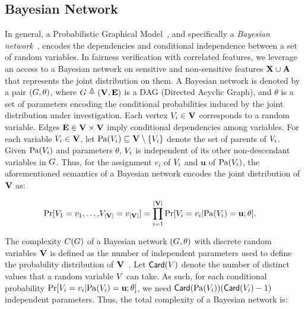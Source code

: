 \subsection{Bayesian Network}
\label{chapter_fairness_preliminaries_BN}
In general, a Probabilistic Graphical Model~\cite{koller2009probabilistic}, and specifically a \textit{Bayesian network}~\cite{pearl1985bayesian,chavira2008probabilistic}, encodes the dependencies and conditional independence between a set of random variables. In fairness verification with correlated features, we leverage an access to a Bayesian network on sensitive and non-sensitive features $ \mathbf{X} \cup \mathbf{A} $ that represents the joint distribution on them. A Bayesian network is denoted by a pair $ (G, \theta)$, where $ G \triangleq (\mathbf{V}, \mathbf{E}) $ is a DAG (Directed Acyclic Graph), and $\theta$ is a set of parameters encoding the conditional probabilities induced by the joint distribution under investigation. Each vertex $V_i \in \mathbf{V}$ corresponds to a random variable. Edges $ \mathbf{E} \in \mathbf{V} \times \mathbf{V} $ imply conditional dependencies among variables. For each variable $ V_i \in \mathbf{V} $, let $ \mathrm{Pa}(V_i) \subseteq \mathbf{V} \setminus \{V_i\} $ denote the set of parents of $ V_i $. Given $\mathrm{Pa}(V_i)$ and parameters $\theta$, $ V_i $ is independent of its other non-descendant variables in $G$. Thus, for the assignment $ v_i $ of $ V_i $ and $ \mathbf{u} $ of $ \mathrm{Pa}(V_i) $, the aforementioned semantics of a Bayesian network encodes the joint distribution of $\mathbf{V}$ as:

\begin{equation}
	\begin{split}
		\Pr[V_1=v_1, \dots, &V_{|\mathbf{V}|}=v_{|\mathbf{V}|}] = \prod_{i=1}^{|\mathbf{V}|} \Pr[V_i = v_i | \mathrm{Pa}(V_i) = \mathbf{u}; \theta].
	\end{split}
	\label{fvgm_eq:BN}
\end{equation}


The complexity $ C(G) $ of a Bayesian network $ (G, \theta) $ with discrete random variables $ \mathbf{V} $ is defined as the number of independent parameters used to define the probability distribution of $ \mathbf{V} $~\cite{murakonda2021quantifying}. Let $ \mathsf{Card}(V) $ denote the number of distinct values that a random variable $ V $ can take. As such, for each conditional probability $ \Pr[V_i = v_i | \mathrm{Pa}(V_i) = \mathbf{u}; \theta] $, we need $ \mathsf{Card}(\mathrm{Pa}(V_i))(\mathsf{Card}(V_i) - 1) $ independent parameters. Thus, the total complexity of a Bayesian network is:

